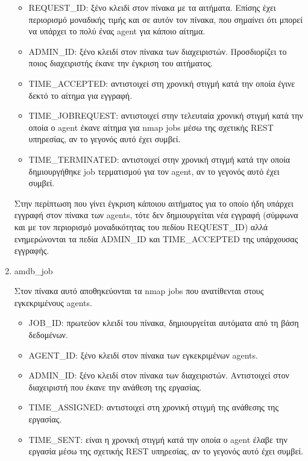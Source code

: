 \documentclass[a4paper,11pt]{article}
\begin{document}
\begin{sloppypar}
\begin{enumerate}
\begin{itemize}
\item REQUEST\_ID: ξένο κλειδί στον πίνακα με τα αιτήματα. Επίσης έχει περιορισμό μοναδικής τιμής και σε αυτόν τον πίνακα, που σημαίνει ότι μπορεί να υπάρχει το πολύ ένας agent για κάποιο αίτημα.

\item ADMIN\_ID: ξένο κλειδί στον πίνακα των διαχειριστών. Προσδιορίζει το ποιος διαχειριστής έκανε την έγκριση του αιτήματος.

\item TIME\_ACCEPTED: αντιστοιχεί στη χρονική στιγμή κατά την οποία έγινε δεκτό το αίτημα για εγγραφή.

\item TIME\_JOBREQUEST: αντιστοιχεί στην τελευταία χρονική στιγμή κατά την οποία ο agent έκανε αίτημα για nmap jobs μέσω της σχετικής REST υπηρεσίας, αν το γεγονός αυτό έχει συμβεί.

\item TIME\_TERMINATED: αντιστοιχεί στην χρονική στιγμή κατά την οποία δημιουργήθηκε job τερματισμού για τον agent, αν το γεγονός αυτό έχει συμβεί.

\end{itemize}

Στην περίπτωση που γίνει έγκριση κάποιου αιτήματος για το οποίο ήδη υπάρχει εγγραφή στον πίνακα των agents, τότε δεν δημιουργείται νέα εγγραφή (σύμφωνα και με τον περιορισμό μοναδικότητας του πεδίου REQUEST\_ID) αλλά ενημερώνονται τα πεδία ADMIN\_ID και TIME\_ACCEPTED της υπάρχουσας εγγραφής.


\item amdb\_job

Στον πίνακα αυτό αποθηκεύονται τα nmap jobs που ανατίθενται στους εγκεκριμένους agents.
\begin{itemize}

\item JOB\_ID: πρωτεύον κλειδί του πίνακα, δημιουργείται αυτόματα από τη βάση δεδομένων.

\item AGENT\_ID: ξένο κλειδί στον πίνακα των εγκεκριμένων agents.

\item ADMIN\_ID: ξένο κλειδί στον πίνακα των διαχειριστών. Αντιστοιχεί στον διαχειριστή που έκανε την ανάθεση της εργασίας.

\item TIME\_ASSIGNED: αντιστοιχεί στη χρονική στιγμή της ανάθεσης της εργασίας.

\item TIME\_SENT: είναι η χρονική στιγμή κατά την οποία ο agent έλαβε την εργασία μέσω της σχετικής REST υπηρεσίας, αν το γεγονός αυτό έχει συμβεί.


\end{itemize}
\end{enumerate}
\end{sloppypar}
\end{document}
